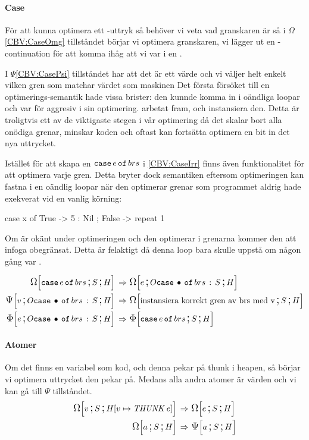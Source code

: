 \documentclass[../Optimise]{subfiles}
\begin{document}
\paragraph{Case}
\label{cbv:case}
För att kunna optimera ett -uttryk så behöver vi veta vad granskaren är
så i $\Omega$\eqref{CBV:CaseOmg} tillståndet börjar vi optimera granskaren, vi lägger ut en
-continuation för att komma ihåg att vi var i en .

I $\Psi$\eqref{CBV:CasePsi} tillståndet har att det är ett värde och vi  väljer 
helt enkelt vilken gren som matchar värdet som maskinen Det första försöket till en optimerings-semantik hade vissa brister: den kunnde komma in i
oändliga loopar och var för aggresiv i sin optimering. 
arbetat fram, och instansiera den.
Detta är troligtvis ett av de viktigaste stegen i vår optimering då det skalar bort alla onödiga 
grenar, minskar koden och oftast kan fortsätta optimera en bit in det nya uttrycket.

Istället för att skapa en $\eCase e brs$ i \eqref{CBV:CaseIrr} finns även
funktionalitet för att
optimera varje gren. Detta bryter dock semantiken eftersom optimeringen kan fastna
i en oändlig loopar när den optimerar grenar som programmet aldrig hade exekverat
vid en vanlig körning: 

\begin{codeEx}
case x of
    { True  -> 5 : Nil
    ; False -> repeat 1
    }
\end{codeEx}

Om  är okänt under optimeringen och den optimerar i grenarna kommer den
att infoga  obegränsat. Detta är felaktigt då denna loop bara skulle uppstå
om  någon gång var .

\begin{align}
\label{CBV:CaseOmg} \OMEGA SH{\eCase e{brs}} \rulesep &\, \OMEGA{\oCase{brs}S}He\\
\label{CBV:CasePsi} \PSI{\oCase{brs}S}Hv \rulesep &\, \OMEGA SH{\text{instansiera korrekt gren av brs med v}} \\
\label{CBV:CaseIrr} \IRR{\oCase{brs}S}He \rulesep &\, \IRR SH{\eCase e brs}
\end{align}


\paragraph{Atomer}
Om det finns en variabel som kod, och denna pekar på thunk i heapen, så börjar vi
optimera uttrycket den pekar på. Medans alla andra atomer är värden och vi kan gå
till $\Psi$ tillståndet.
\begin{align}
\OMEGA S{\heap{v}{\THUNK{e}}}v \rulesep &\, \OMEGA SHe \\
\OMEGA SHa \rulesep &\, \PSI SHa
\end{align}
\end{document}
